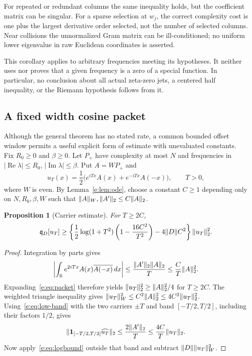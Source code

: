 \documentclass[11pt,a4paper]{article}
\numberwithin{equation}{section}
\newtheorem{proposition}[theorem]{Proposition}
\theoremstyle{definition}\newtheorem{definition}[theorem]{Definition}
\theoremstyle{remark}\newtheorem{remark}[theorem]{Remark}
\newcommand{\R}{\mathbb R}\newcommand{\C}{\mathbb C}\newcommand{\N}{\mathbb N}
\newcommand{\qD}{\mathfrak q_D}\newcommand{\qth}{\mathfrak q_\theta}
\DeclareMathOperator{\Rea}{Re}\DeclareMathOperator{\Ima}{Im}
\begin{document}
For repeated or redundant columns the same inequality holds, but the
coefficient matrix can be singular. For a sparse selection at $w_j$, the
correct complexity cost is one plus the largest derivative order selected,
not the number of selected columns. Near collisions the unnormalized Gram
matrix can be ill-conditioned; no uniform lower eigenvalue in raw
Euclidean coordinates is asserted.

This corollary applies to arbitrary frequencies meeting its hypotheses.
It neither uses nor proves that a given frequency is a zero of a special
function. In particular, no conclusion about all actual zeta-zero jets,
a centered half inequality, or the Riemann hypothesis follows from it.

\subsection{A fixed width cosine packet}\label{e:sec:packet}

Although the general theorem has no stated rate, a common bounded offset
window permits a useful explicit form of estimate with unevaluated
constants. Fix $R_0\ge0$ and $\beta\ge0$. Let $P_+$ have complexity at most $N$ and frequencies in
$|\Rea\lambda|\le R_0$, $|\Ima\lambda|\le\beta$. Put $A=WP_+$ and
\begin{equation}\label{e:eq:packet}
 u_T(x)=\frac12\bigl(e^{iTx}A(x)+e^{-iTx}A(-x)\bigr),\qquad T>0,
\end{equation}
where $W$ is even. By Lemma~\ref{e:lem:ode}, choose a constant $C\ge1$
depending only on $N,R_0,\beta,W$ such that
$\lVert A\rVert_W,\lVert A'\rVert_2\le C\lVert A\rVert_2$.

\begin{proposition}[Carrier estimate]\label{e:prop:packet}
For $T\ge2C$,
\begin{equation}\label{e:eq:packet-bound}
 \qD[u_T]\ge\left\{
 \frac12\log(1+T^2)\left(1-\frac{16C^2}{T^2}\right)
 -4\norm D C^2\right\}\norm{u_T}_2^2.
\end{equation}
\end{proposition}
\begin{proof}
Integration by parts gives
\[
 \left|\int_\R e^{2iTx}A(x)\overline{A(-x)}\,dx\right|
 \le\frac{\norm{A'}_2\norm A_2}{T}
 \le\frac C T\norm A_2^2.
\]
Expanding~\eqref{e:eq:packet} therefore yields
$\lVert u_T\rVert_2^2\ge\lVert A\rVert_2^2/4$ for $T\ge2C$.
The weighted triangle inequality gives
$\lVert u_T\rVert_W^2\le C^2\lVert A\rVert_2^2\le4C^2\lVert u_T\rVert_2^2$.
Using~\eqref{e:eq:low-band} with the two carriers $\pm T$ and band
$[-T/2,T/2]$, including their factors $1/2$, gives
\[
 \lVert\mathbf1_{[-T/2,T/2]}\widehat{u_T}\rVert_2
 \le\frac{2\lVert A'\rVert_2}{T}
 \le\frac{4C}{T}\lVert u_T\rVert_2.
\]
Now apply~\eqref{e:eq:logbound} outside that band and subtract
$\lVert D\rVert\lVert u_T\rVert_W^2$.
\end{proof}
\end{document}
